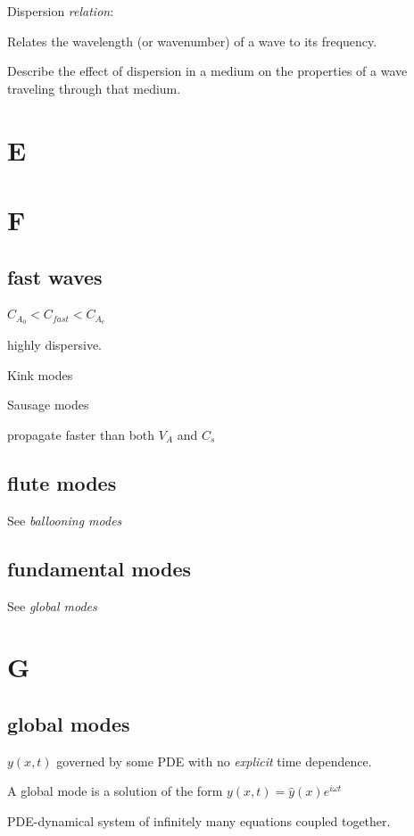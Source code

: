 \documentclass[12pt]{article}
\begin{document}
Dispersion \emph{relation}:
\begin{itemize*}
    \item Relates the wavelength (or wavenumber) of a wave to its
        frequency.
    \item Describe the effect of dispersion in a medium on the properties
        of a wave traveling through that medium.
\end{itemize*}

\section*{E}

\section*{F}

\subsection*{fast waves}
\begin{itemize*}
    \item $C_{A_0} < C_{fast} < C_{A_e} $
    \item highly dispersive.
    \item Kink modes
    \item Sausage modes
    \item propagate faster than both $V_A$ and $C_s$
\end{itemize*}

\subsection*{flute modes}
See \emph{ballooning modes}

\subsection*{fundamental modes}
See \emph{global modes}

\section*{G}

\subsection*{global modes}
\begin{itemize*}
    \item $y(x,t)$ governed by some PDE with no \emph{explicit} time dependence.
    \item A global mode is a solution of the form
        $y(x,t) = \hat{y}(x)e^{i\omega t}$
    \item PDE-dynamical system of infinitely many equations coupled together.
\end{itemize*}
\end{document}
